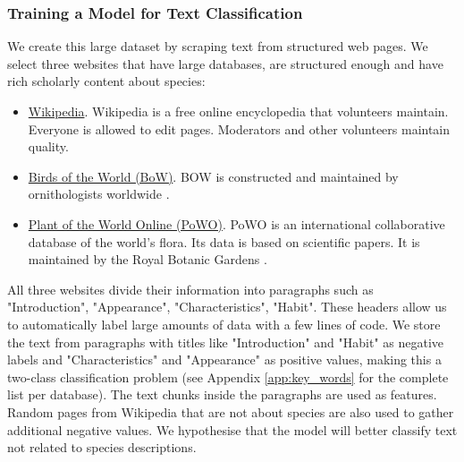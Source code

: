 \documentclass[a4paper, 12pt, oneside]{book} %
\begin{document}
\subsubsection{Training a Model for Text Classification} \label{par:reedloss}
We create this large dataset by scraping text from structured web pages.
We select three websites that have large databases, are structured enough and have rich scholarly content about species:
\begin{itemize}
    \item \href{www.wikipedia.com}{Wikipedia}. Wikipedia is a free online encyclopedia that volunteers maintain. Everyone is allowed to edit pages. Moderators and other volunteers maintain quality.
    \item \href{https://birdsoftheworld.org/bow/home}{Birds of the World (BoW)}. BOW is constructed and maintained by ornithologists worldwide \autocite{billerman_birds_2020}.
    \item \href{https://powo.science.kew.org/}{Plant of the World Online (PoWO)}. PoWO is an international collaborative database of the world's flora. Its data is based on scientific papers. It is maintained by the Royal Botanic Gardens \autocite{facilitated_by_the_royal_botanic_gardens_plants_2019}.
\end{itemize}
All three websites divide their information into paragraphs such as "Introduction", "Appearance", "Characteristics", "Habit".
These headers allow us to automatically label large amounts of data with a few lines of code.
We store the text from paragraphs with titles like "Introduction" and "Habit" as negative labels and "Characteristics" and "Appearance" as positive values, making this a two-class classification problem (see Appendix \ref{app:key_words} for the complete list per database).
The text chunks inside the paragraphs are used as features.
Random pages from Wikipedia that are not about species are also used to gather additional negative values.
We hypothesise that the model will better classify text not related to species descriptions.

\end{document}
